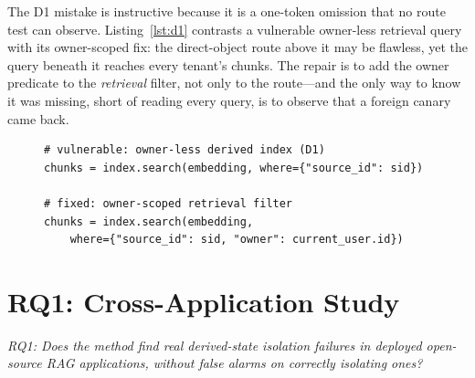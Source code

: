 \IfFileExists{IEEEtran.cls}{\documentclass[conference]{IEEEtran}}{\documentclass[10pt,twocolumn]{article}}
\begin{document}
\begin{table}[t]\centering\small
\caption{Seeded minimal reproducible examples: each class leaks before its fix and is clean after.}
\label{tab:mre}

\end{table}

The D1 mistake is instructive because it is a one-token omission that no route test can
observe. Listing~\ref{lst:d1} contrasts a vulnerable owner-less retrieval query with its
owner-scoped fix: the direct-object route above it may be flawless, yet the query beneath it reaches
every tenant's chunks. The repair is to add the owner predicate to the \emph{retrieval} filter, not
only to the route---and the only way to know it was missing, short of reading every query, is to
observe that a foreign canary came back.

\begin{figure}[t]
\begin{lstlisting}[caption={D1 in one line. The retrieval query selects chunks by resource id alone
(top); the fix (bottom) scopes the same query by owner. The direct-object route is unchanged and
may be correct in both cases.},label={lst:d1}]
# vulnerable: owner-less derived index (D1)
chunks = index.search(embedding, where={"source_id": sid})

# fixed: owner-scoped retrieval filter
chunks = index.search(embedding,
    where={"source_id": sid, "owner": current_user.id})
\end{lstlisting}
\end{figure}

\section{RQ1: Cross-Application Study}
\label{sec:ea1}
\emph{RQ1: Does the method find real derived-state isolation failures in deployed open-source RAG
applications, without false alarms on correctly isolating ones?}
\end{document}
